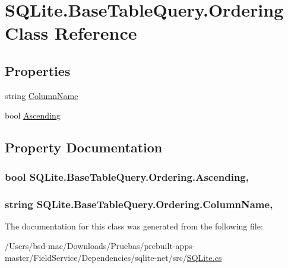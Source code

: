 \hypertarget{class_s_q_lite_1_1_base_table_query_1_1_ordering}{\section{S\+Q\+Lite.\+Base\+Table\+Query.\+Ordering Class Reference}
\label{class_s_q_lite_1_1_base_table_query_1_1_ordering}
}
\subsection*{Properties}
\begin{DoxyCompactItemize}
\item 
string \hyperlink{class_s_q_lite_1_1_base_table_query_1_1_ordering_a4a73e6f27bb0b7b71672c2440f1e26d8}{Column\+Name}
\item 
bool \hyperlink{class_s_q_lite_1_1_base_table_query_1_1_ordering_a6ac459a921405f8a577c64f70e615359}{Ascending}
\end{DoxyCompactItemize}


\subsection{Property Documentation}
\hypertarget{class_s_q_lite_1_1_base_table_query_1_1_ordering_a6ac459a921405f8a577c64f70e615359}{
\subsubsection[{Ascending}]{\setlength{\rightskip}{0pt plus 5cm}bool S\+Q\+Lite.\+Base\+Table\+Query.\+Ordering.\+Ascending\hspace{0.3cm}{\ttfamily [get]}, {\ttfamily [set]}}}\label{class_s_q_lite_1_1_base_table_query_1_1_ordering_a6ac459a921405f8a577c64f70e615359}
\hypertarget{class_s_q_lite_1_1_base_table_query_1_1_ordering_a4a73e6f27bb0b7b71672c2440f1e26d8}{
\subsubsection[{Column\+Name}]{\setlength{\rightskip}{0pt plus 5cm}string S\+Q\+Lite.\+Base\+Table\+Query.\+Ordering.\+Column\+Name\hspace{0.3cm}{\ttfamily [get]}, {\ttfamily [set]}}}\label{class_s_q_lite_1_1_base_table_query_1_1_ordering_a4a73e6f27bb0b7b71672c2440f1e26d8}


The documentation for this class was generated from the following file\+:\begin{DoxyCompactItemize}
\item 
/\+Users/bsd-\/mac/\+Downloads/\+Pruebas/prebuilt-\/apps-\/master/\+Field\+Service/\+Dependencies/sqlite-\/net/src/\hyperlink{_s_q_lite_8cs}{S\+Q\+Lite.\+cs}\end{DoxyCompactItemize}
